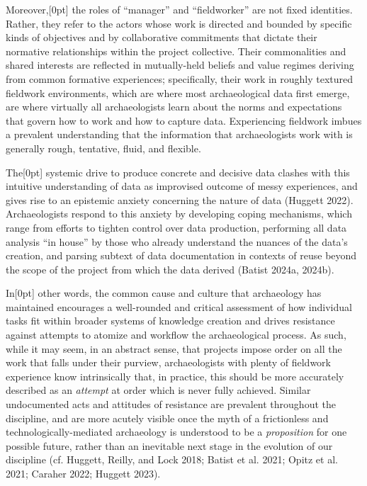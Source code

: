\documentclass[
]{article}
\newcommand{\paragraphnumber}[1]{\marginnote{\color{lightgray}\tiny{#1}}[0pt]}
\begin{document}
Moreover,\paragraphnumber{[81]} the roles of ``manager'' and
``fieldworker'' are not fixed identities. Rather, they refer to the
actors whose work is directed and bounded by specific kinds of
objectives and by collaborative commitments that dictate their normative
relationships within the project collective. Their commonalities and
shared interests are reflected in mutually-held beliefs and value
regimes deriving from common formative experiences; specifically, their
work in roughly textured fieldwork environments, which are where most
archaeological data first emerge, are where virtually all archaeologists
learn about the norms and expectations that govern how to work and how
to capture data. Experiencing fieldwork imbues a prevalent understanding
that the information that archaeologists work with is generally rough,
tentative, fluid, and flexible.

The\paragraphnumber{[82]} systemic drive to produce concrete and
decisive data clashes with this intuitive understanding of data as
improvised outcome of messy experiences, and gives rise to an epistemic
anxiety concerning the nature of data (Huggett 2022). Archaeologists
respond to this anxiety by developing coping mechanisms, which range
from efforts to tighten control over data production, performing all
data analysis ``in house'' by those who already understand the nuances
of the data's creation, and parsing subtext of data documentation in
contexts of reuse beyond the scope of the project from which the data
derived (Batist 2024a, 2024b).

In\paragraphnumber{[83]} other words, the common cause and culture that
archaeology has maintained encourages a well-rounded and critical
assessment of how individual tasks fit within broader systems of
knowledge creation and drives resistance against attempts to atomize and
workflow the archaeological process. As such, while it may seem, in an
abstract sense, that projects impose order on all the work that falls
under their purview, archaeologists with plenty of fieldwork experience
know intrinsically that, in practice, this should be more accurately
described as an \emph{attempt} at order which is never fully achieved.
Similar undocumented acts and attitudes of resistance are prevalent
throughout the discipline, and are more acutely visible once the myth of
a frictionless and technologically-mediated archaeology is understood to
be a \emph{proposition} for one possible future, rather than an
inevitable next stage in the evolution of our discipline (cf. Huggett,
Reilly, and Lock 2018; Batist et al. 2021; Opitz et al. 2021; Caraher
2022; Huggett 2023).
\end{document}
